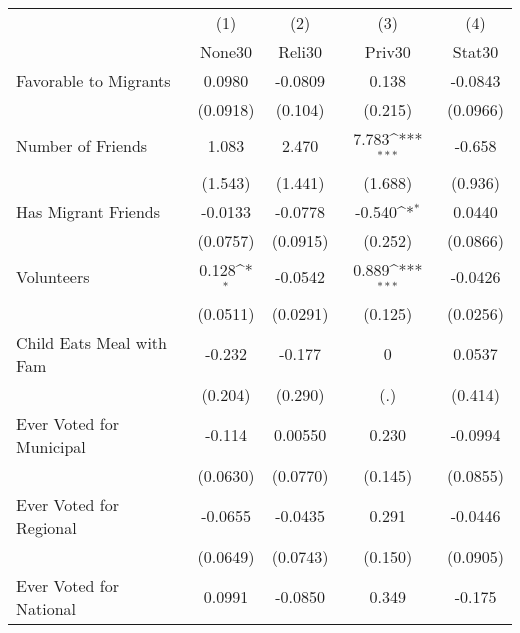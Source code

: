 {
\def\sym#1{\ifmmode^{#1}\else\(^{#1}\)\fi}
\begin{tabular}{l*{4}{c}}
\hline\hline
            &\multicolumn{1}{c}{(1)}&\multicolumn{1}{c}{(2)}&\multicolumn{1}{c}{(3)}&\multicolumn{1}{c}{(4)}\\
            &\multicolumn{1}{c}{None30}&\multicolumn{1}{c}{Reli30}&\multicolumn{1}{c}{Priv30}&\multicolumn{1}{c}{Stat30}\\
\hline
Favorable to Migrants&      0.0980         &     -0.0809         &       0.138         &     -0.0843         \\
            &    (0.0918)         &     (0.104)         &     (0.215)         &    (0.0966)         \\
[1em]
Number of Friends&       1.083         &       2.470         &       7.783\sym{***}&      -0.658         \\
            &     (1.543)         &     (1.441)         &     (1.688)         &     (0.936)         \\
[1em]
Has Migrant Friends&     -0.0133         &     -0.0778         &      -0.540\sym{*}  &      0.0440         \\
            &    (0.0757)         &    (0.0915)         &     (0.252)         &    (0.0866)         \\
[1em]
Volunteers  &       0.128\sym{*}  &     -0.0542         &       0.889\sym{***}&     -0.0426         \\
            &    (0.0511)         &    (0.0291)         &     (0.125)         &    (0.0256)         \\
[1em]
Child Eats Meal with Fam&      -0.232         &      -0.177         &           0         &      0.0537         \\
            &     (0.204)         &     (0.290)         &         (.)         &     (0.414)         \\
[1em]
Ever Voted for Municipal&      -0.114         &     0.00550         &       0.230         &     -0.0994         \\
            &    (0.0630)         &    (0.0770)         &     (0.145)         &    (0.0855)         \\
[1em]
Ever Voted for Regional&     -0.0655         &     -0.0435         &       0.291         &     -0.0446         \\
            &    (0.0649)         &    (0.0743)         &     (0.150)         &    (0.0905)         \\
[1em]
Ever Voted for National&      0.0991         &     -0.0850         &       0.349         &      -0.175         \\

\end{tabular}}
